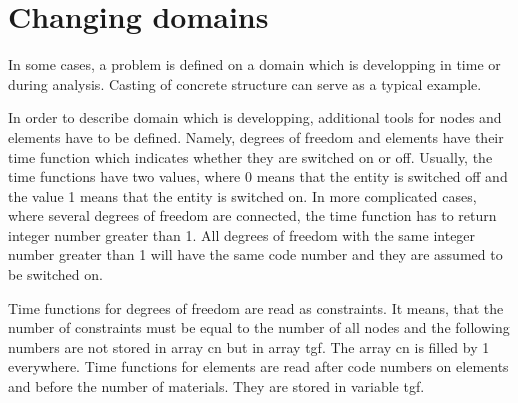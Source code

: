 \chapter{Changing domains}

In some cases, a problem is defined on a domain which is developping
in time or during analysis. Casting of concrete structure can serve as
a typical example.

In order to describe domain which is developping, additional tools for
nodes and elements have to be defined. Namely, degrees of freedom
and elements have their time function which indicates whether they
are switched on or off. Usually, the time functions have two values,
where 0 means that the entity is switched off and the value 1 means
that the entity is switched on. In more complicated cases, where
several degrees of freedom are connected, the time function has to return
integer number greater than 1. All degrees of freedom with the same
integer number greater than 1 will have the same code number and they
are assumed to be switched on.

Time functions for degrees of freedom are read as constraints.
It means, that the number of constraints must be equal to the
number of all nodes and the following numbers are not stored in
array cn but in array tgf. The array cn is filled by 1 everywhere.
Time functions for elements are read after code numbers on elements
and before the number of materials. They are stored in variable tgf.

